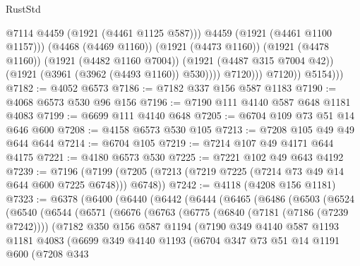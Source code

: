\begin{lexlean}{RustStd}
\begin{coremodule}
                            @7114
                            @4459
                            (@1921 (@4461 @1125 @587)))
                          @4459
                          (@1921 (@4461 @1100 @1157)))
                        (@4468 (@4469 @1160))
                        (@1921 (@4473 @1160))
                        (@1921 (@4478 @1160))
                        (@1921 (@4482 @1160 @7004))
                        (@1921 (@4487 @315 @7004 @42))
                        (@1921 (@3961 (@3962 (@4493 @1160)) @530))))
                    @7120)))
              @7120))
          @5154)))
@7182 := @4052 @6573
@7186 := @7182 @337 @156 @587 @1183
@7190 := @4068 @6573 @530 @96 @156
@7196 := @7190 @111 @4140 @587 @648 @1181 @4083
@7199 := @6699 @111 @4140 @648
@7205 := @6704 @109 @73 @51 @14 @646 @600
@7208 := @4158 @6573 @530 @105
@7213 := @7208 @105 @49 @49 @644 @644
@7214 := @6704 @105
@7219 := @7214 @107 @49 @4171 @644 @4175
@7221 := @4180 @6573 @530
@7225 := @7221 @102 @49 @643 @4192
@7239 := @7196 (@7199 (@7205 (@7213 (@7219 @7225 (@7214 @73 @49 @14 @644 @600 @7225 @6748))) @6748))
@7242 := @4118 (@4208 @156 @1181)
@7323 := @6378
    (@6400
      (@6440
        (@6442
          (@6444
            (@6465
              (@6486
                (@6503
                  (@6524
                    (@6540
                      (@6544
                        (@6571
                          (@6676
                            (@6763
                              (@6775
                                (@6840 (@7181 (@7186 (@7239 @7242))))
                                (@7182
                                  @350
                                  @156
                                  @587
                                  @1194
                                  (@7190
                                    @349
                                    @4140
                                    @587
                                    @1193
                                    @1181
                                    @4083
                                    (@6699
                                      @349
                                      @4140
                                      @1193
                                      (@6704
                                        @347
                                        @73
                                        @51
                                        @14
                                        @1191
                                        @600
                                        (@7208
                                          @343

\end{coremodule}
\end{lexlean}
